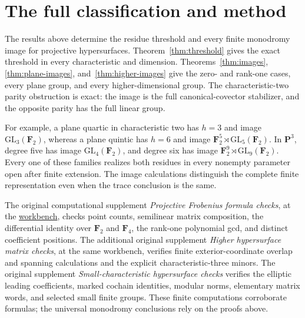 \documentclass[11pt]{article}
\newcommand{\workbenchurl}{https://github.com/KokunoYumeto/schemes-and-moduli-workbench}
\begin{document}








\section{The full classification and method}
The results above determine the residue threshold and every finite monodromy image for projective hypersurfaces. Theorem~\ref{thm:threshold} gives the exact threshold in every characteristic and dimension. Theorems~\ref{thm:images}, \ref{thm:plane-images}, and~\ref{thm:higher-images} give the zero- and rank-one cases, every plane group, and every higher-dimensional group. The characteristic-two parity obstruction is exact: the image is the full canonical-covector stabilizer, and the opposite parity has the full linear group.

For example, a plane quartic in characteristic two has $h=3$ and image $\mathrm{GL}_3(\mathbf F_2)$, whereas a plane quintic has $h=6$ and image $\mathbf F_2^5\rtimes\mathrm{GL}_5(\mathbf F_2)$. In $\mathbf P^3$, degree five has image $\mathrm{GL}_4(\mathbf F_2)$, and degree six has image $\mathbf F_2^9\rtimes\mathrm{GL}_9(\mathbf F_2)$. Every one of these families realizes both residues in every nonempty parameter open after finite extension. The image calculations distinguish the complete finite representation even when the trace conclusion is the same.

The original computational supplement \emph{Projective Frobenius formula checks}, at the \href{\workbenchurl}{workbench}, checks point counts, semilinear matrix composition, the differential identity over $\mathbf F_2$ and $\mathbf F_4$, the rank-one polynomial gcd, and distinct coefficient positions. The additional original supplement \emph{Higher hypersurface matrix checks}, at the same workbench, verifies finite exterior-coordinate overlap and spanning calculations and the explicit characteristic-three minors. The original supplement \emph{Small-characteristic hypersurface checks} verifies the elliptic leading coefficients, marked cochain identities, modular norms, elementary matrix words, and selected small finite groups. These finite computations corroborate formulas; the universal monodromy conclusions rely on the proofs above.
\end{document}
